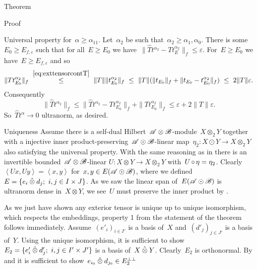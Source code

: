 \documentclass[b]{subfiles}
\begin{document}
\begin{parsec}
\begin{point}{Theorem}
\begin{point}{Proof}
\begin{point}{Universal property}
    for~$\alpha \geq \alpha_11$.
Let~$\alpha_2$ be such that~$\alpha_2 \geq \alpha_1,\alpha_0$.
There is some~$E_0 \geq E_{f,\varepsilon}$
such that for all~$E \geq E_0$
we have~$\| \hat{T} t^{\alpha_2} -T t^{\alpha_2}_E \|_f \leq \varepsilon$.
For~$E \geq E_0$ we have~$E \geq E_{f,\varepsilon}$ and so
\begin{equation*}
 \|T t^{\alpha_2}_{E_0}\|_f
 \  \overset{\eqref{eq:exttensorcontT}}{\leq}\  \|T\| \|t^{\alpha_2}_{E_0}\|_f
  \  \leq\ \|T\|
    (\| t_{E_0} \|_f  +
            \|t_{E_0} - t^{\alpha_2}_{E_0}\|_f)
   \ \leq\  2 \|T\| \varepsilon.
\end{equation*}
    Consequently
\begin{equation*}
    \|\hat{T} t^{\alpha_2} \|_f \leq 
    \|\hat{T} t^{\alpha_2} - T t^{\alpha_2}_{E_0} \|_f
                + \|T t^{\alpha_2}_{E_0}\|_f
    \leq \varepsilon + 2\|T\|\varepsilon.
\end{equation*}
So~$\hat{T}t^\alpha \to 0$ ultranorm, as desired.
\end{point}
\begin{point}{Uniqueness}%
Assume there is a self-dual Hilbert~$\mathscr{A}\otimes\mathscr{B}$-module~$X \otimes_2 Y$
    together with a injective
    inner product-preserving~$\mathscr{A}\odot\mathscr{B}$-linear
    map~$\eta_2 \colon X \odot Y \to X \otimes_2 Y$
    also satisfying the universal property.
With the same reasoning as in 
    there is an invertible bounded~$\mathscr{A}\otimes\mathscr{B}$-linear
    $U\colon X \otimes Y \to X \otimes_2 Y$
    with~$U \mathop{\circ} \eta = \eta_2$.
Clearly~$\left<Ux, U y\right> = \left<x,y\right>$
    for~$x,y \in E (\mathscr{A}\odot\mathscr{B})$,
    where we defined~$E = \{e_i \hotimes d_j; \ i,j \in I\times J\}$.
As we saw the linear span of~$E (\mathscr{A}\odot\mathscr{B})$
    is ultranorm dense in~$X \otimes Y$,
    we see~$U$ must preserve the inner product by .
\end{point}
\begin{point}%
As we just have shown any exterior tensor is unique up to unique isomorphism,
    which respects the embeddings, property 1 from the statement
    of the theorem follows immediately.
Assume~$(e'_i)_{i \in I'}$ is a basis of~$X$
    and~$(d'_j)_{j \in J'}$ is a basis of~$Y$.
Using the unique isomorphism, it is sufficient to show
$E_2 =\{ e'_i \mathbin{\hat{\otimes}} d'_j; \ i,j \in I'\times J'\}$
is a basis of~$X \mathbin{\hat{\otimes}} Y$.
Clearly~$E_2$ is orthonormal.
By  and 
    it is sufficient to show~$e_{i_0} \mathbin{\hat{\otimes}} d_{j_0} \in E_2^{\perp\perp}$

\end{point}
\end{point}
\end{point}
\end{parsec}
\end{document}
